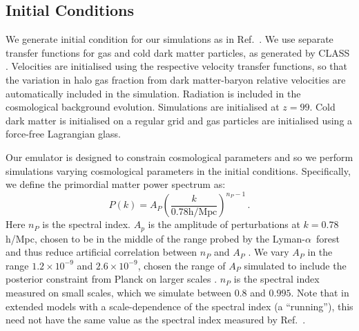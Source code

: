 \documentclass[a4paper,11pt]{article}
\newcommand{\Lya}{Lyman-$\alpha$}
\begin{document}

\subsection{Initial Conditions}
\label{sec:initconds}

We generate initial condition for our simulations as in Ref.~\cite{Bird:2020}. We use separate transfer functions for gas and cold dark matter particles, as generated by CLASS \cite{CLASS}. Velocities are initialised using the respective velocity transfer functions, so that the variation in halo gas fraction from dark matter-baryon relative velocities are automatically included in the simulation. Radiation is included in the cosmological background evolution. Simulations are initialised at $z=99$. Cold dark matter is initialised on a regular grid and gas particles are initialised using a force-free Lagrangian glass.

Our emulator is designed to constrain cosmological parameters and so we perform simulations varying cosmological parameters in the initial conditions. Specifically, we define the primordial matter power spectrum as:
\begin{equation}
 P(k) = A_P \left(\frac{k}{ 0.78 \mathrm{h/Mpc}}\right)^{n_P-1}\,.
 \label{eq:pk}
\end{equation}
Here $n_P$ is the spectral index. $A_p$ is the amplitude of perturbations at $k = 0.78$ h/Mpc, chosen to be in the middle of the range probed by the \Lya~forest and thus reduce artificial correlation between $n_P$ and $A_P$ \cite{Bird:2019}. We vary $A_P$ in the range $1.2 \times 10^{-9}$ and $2.6 \times 10^{-9}$, chosen the range of $A_P$ simulated to include the posterior constraint from Planck on larger scales \cite{Planck:2018}.
$n_P$ is the spectral index measured on small scales, which we simulate between $0.8$ and $0.995$. Note that in extended models with a scale-dependence of the spectral index (a ``running''), this need not have the same value as the spectral index measured by Ref.~\cite{Planck:2018}.
\end{document}
